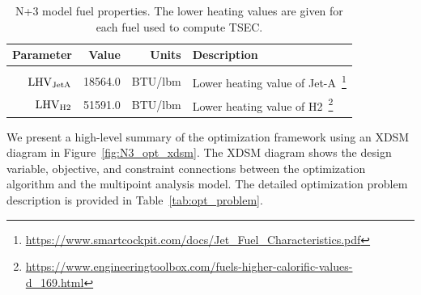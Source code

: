 \documentclass[conf]{new-aiaa}
\begin{document}
\begin{table}[hbt!]
    \centering
    \caption{
        N+3 model fuel properties.
        The lower heating values are given for each fuel used to compute TSEC.}
    \begin{tabular}{r r r l}
        \hline
        Parameter              & Value   & Units        & Description                                                                                                            \\
        \hline                                                                                                                                                                   \\
        $\rm{LHV}_{\rm{JetA}}$ & 18564.0 & \si{BTU/lbm} & Lower heating value of Jet-A~\footnote{\url{https://www.smartcockpit.com/docs/Jet_Fuel_Characteristics.pdf}}           \\
        $\rm{LHV}_{\rm{H2}}$   & 51591.0 & \si{BTU/lbm} & Lower heating value of H2~\footnote{\url{https://www.engineeringtoolbox.com/fuels-higher-calorific-values-d_169.html}} \\
        \hline
    \end{tabular}
    \label{fuel_props}
\end{table}

We present a high-level summary of the optimization framework using an XDSM diagram in Figure~\ref{fig:N3_opt_xdsm}.
The XDSM diagram shows the design variable, objective, and constraint connections between the optimization algorithm and the multipoint analysis model.
The detailed optimization problem description is provided in Table~\ref{tab:opt_problem}.
\end{document}
